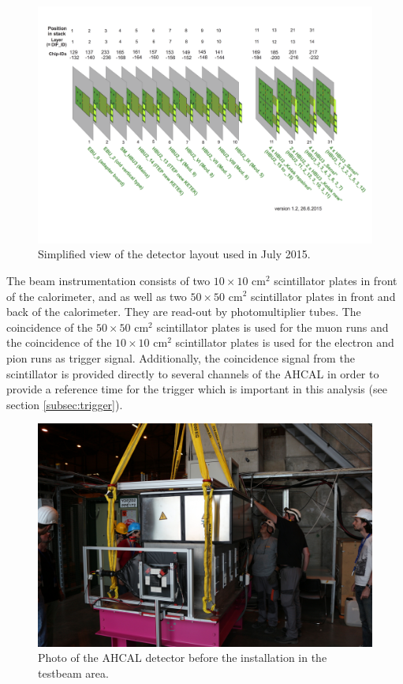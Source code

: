 \begin{figure}[htbp!]
	\centering
	\includegraphics[width=0.8\linewidth]{chap5/fig_EnergyCalib/Detector_layout.png}
	\caption{Simplified view of the detector layout used in July 2015.} \label{fig:Det_layout}
\end{figure}

The beam instrumentation consists of two $10\times10$ cm$^2$ scintillator plates in front of the calorimeter, and as well as two $50\times50$ cm$^2$ scintillator plates in front and back of the calorimeter. They are read-out by photomultiplier tubes. The coincidence of the $50\times50$ cm$^2$ scintillator plates is used for the muon runs and the coincidence of the $10\times10$ cm$^2$ scintillator plates is used for the electron and pion runs as trigger signal. Additionally, the coincidence signal from the scintillator is provided directly to several channels of the AHCAL in order to provide a reference time for the trigger which is important in this analysis (see section \ref{subsec:trigger}).

\begin{figure}[htbp!]
	\centering
	\includegraphics[width=0.6\linewidth]{chap5/fig_EnergyCalib/IMG_1170.jpg}
	\caption{Photo of the AHCAL detector before the installation in the testbeam area.} \label{fig:AHCAL_photo}
\end{figure}

